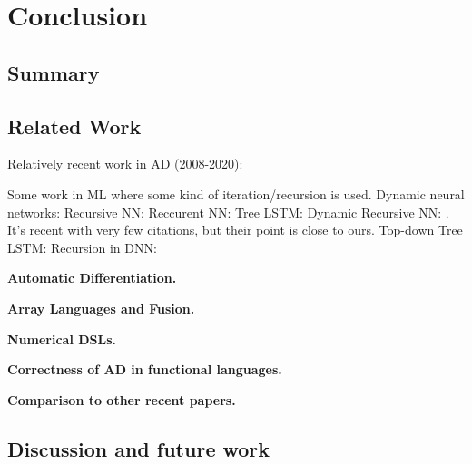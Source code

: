 \section{Conclusion}

\subsection{Summary} %
\label{sub:summary}

\subsection{Related Work} %
\label{sub:related_work}

Relatively recent work in AD (2008-2020):
\cite{mak2020differential,elliotthigher,vytiniotis2019differentiable,innes2018don,baydin2017automatic,huot2020correctness,gallagher-sdg,manzyuk2012confusion,wang2018demystifying,beck1994if,wang2018backpropagation,betancourt2018geometric,elliott2018simple,carpenter2015stan,paszke2017automatic,shaikhha2019efficient,innes2019zygote,griewank2008evaluating,kucukelbir2017automatic,brunel2019backpropagation,barthe2020versatility,abadi2019simple,cockett2019reverse,van2018automatic,hascoet2013tapenade,abadi2016tensorflow,pearlmutter2008reverse,bergstra2010theano,fong2019backprop,ehrhard2003differential,agrawal2019tensorflow,bettencourt2019taylor,cruttwell2017cartesian,manzyuk2012simply,laue2018computing}

Some work in ML where some kind of iteration/recursion is used.
Dynamic neural networks: \cite{jin2017manipulability,wu2016deep}
Recursive NN: \cite{socher2011parsing,biancofiore2017recursive}
Reccurent NN: \cite{bahdanau2014neural,luong2015effective}
Tree LSTM: \cite{tai2015improved,chen2016enhanced}
Dynamic Recursive NN: \cite{guo2019dynamic}. It's recent with very few citations, but their point is close to ours. 
Top-down Tree LSTM: \cite{zhang2015top}
Recursion in DNN: \cite{jeong2018improving}

\noindent \textbf{Automatic Differentiation.} 

\noindent \textbf{Array Languages and Fusion.}

\noindent \textbf{Numerical DSLs.} 

\noindent \textbf{Correctness of AD in functional languages.}

\noindent \textbf{Comparison to other recent papers.}

\subsection{Discussion and future work} %
\label{sub:discussion_and_future_work}

